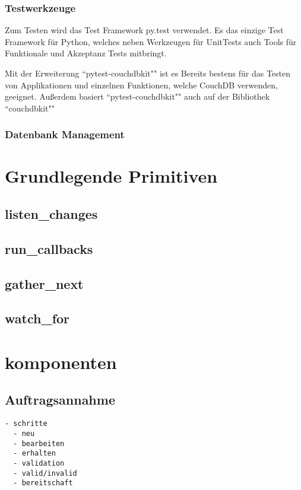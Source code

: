 \subsubsection{Testwerkzeuge}

Zum Testen wird das Test Framework py.test \cite{pytest:website} verwendet.
Es das einzige Test Framework für Python,
welches neben Werkzeugen für UnitTests auch Tools für
Funktionale und Akzeptanz Tests mitbringt.

Mit der Erweiterung ``pytest-couchdbkit"" \cite{pytest:couchdbkit} ist es Bereits
bestens für das Testen von Applikationen und einzelnen Funktionen,
welche CouchDB verwenden, geeignet.
Außerdem basiert ``pytest-couchdbkit"" auch auf der Bibliothek ``couchdbkit""

\subsubsection{Datenbank Management}

\section{Grundlegende Primitiven}

\subsection{listen\_changes}

\subsection{run\_callbacks}
\subsection{gather\_next}
\subsection{watch\_for}

\section{komponenten}

\subsection{Auftragsannahme}

\begin{verbatim}
- schritte
  - neu
  - bearbeiten
  - erhalten
  - validation
  - valid/invalid
  - bereitschaft
\end{verbatim}

